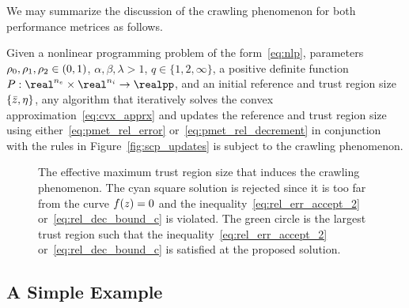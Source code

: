 \documentclass[letterpaper, 10 pt, conference]{ieeeconf}
\begin{document}
We may summarize the discussion of the crawling phenomenon for both performance metrices as follows.
\begin{theorem}
Given a nonlinear programming problem of the form~\eqref{eq:nlp}, parameters $\rho_0,\rho_1,\rho_2\in(0,1)$, $\alpha,\beta,\lambda>1$, $q\in\{1,2,\infty\}$, a positive definite function $P:\real^{n_e}\times\real^{n_i}\rightarrow\realpp$, and an initial reference and trust region size $\{\bar{z},\eta\}$, any algorithm that iteratively solves the convex approximation~\eqref{eq:cvx_apprx} and updates the reference and trust region size using either~\eqref{eq:pmet_rel_error} or~\eqref{eq:pmet_rel_decrement} in conjunction with the rules in Figure~\ref{fig:scp_updates} is subject to the crawling phenomenon.
\end{theorem}

\begin{figure}
\centering

\caption{The effective maximum trust region size that induces the crawling phenomenon. The cyan square solution is rejected since it is too far from the curve $f(z)=0$ and the inequality~\eqref{eq:rel_err_accept_2} or~\eqref{eq:rel_dec_bound_c} is violated. The green circle is the largest trust region such that the inequality~\eqref{eq:rel_err_accept_2} or~\eqref{eq:rel_dec_bound_c} is satisfied at the proposed solution.}
\label{fig:effective_tr}
\end{figure}

\subsection{A Simple Example}\label{subsec:toy_example}
\end{document}

